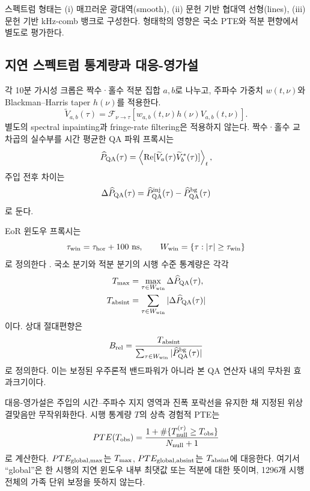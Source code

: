 \documentclass[final,5p,times]{elsarticle}
\newcommand{\NMainRows}{1296}
\begin{document}
스펙트럼 형태는 (i) 매끄러운 광대역(smooth), (ii) 문헌 기반
협대역 선형(lines), (iii) 문헌 기반 kHz-comb 뱅크로 구성한다.
형태학의 영향은 국소 PTE와 적분 편향에서 별도로 평가한다.

\subsection{지연 스펙트럼 통계량과 대응-영가설}
\label{sec:metrics}

각 10분 가시성 크롭은 짝수·홀수 적분 집합 $a,b$로 나누고,
주파수 가중치 $w(t,\nu)$와 Blackman--Harris taper $h(\nu)$를
적용한다.
\begin{equation}
 \widetilde V_{a,b}(\tau)=
 \mathcal F_{\nu\rightarrow\tau}
 \left[w_{a,b}(t,\nu)h(\nu)V_{a,b}(t,\nu)\right].
\end{equation}
별도의 spectral inpainting과 fringe-rate filtering은 적용하지 않는다.
짝수·홀수 교차곱의 실수부를 시간 평균한 QA 파워 프록시는
\begin{equation}
 \widehat P_{\rm QA}(\tau)=
 \left\langle\mathrm{Re}
 [\widetilde V_a(\tau)\widetilde V_b^*(\tau)]\right\rangle_t,
\end{equation}
주입 전후 차이는
\begin{equation}
 \Delta\widehat P_{\rm QA}(\tau)=
 \widehat P_{\rm QA}^{\rm inj}(\tau)-\widehat P_{\rm QA}^{\rm bg}(\tau)
\end{equation}
로 둔다.

EoR 윈도우 프록시는
\begin{equation}
 \tau_{\rm win}=\tau_{\rm hor}+100~{\rm ns},\qquad
 W_{\rm win}=\{\tau:|\tau|\ge\tau_{\rm win}\}
\end{equation}
로 정의한다
\citep{parsons2012delay,pober2013,liu2014wedge}. 국소 분기와 적분
분기의 시행 수준 통계량은 각각
\begin{align}
 T_{\rm max}&=\max_{\tau\in W_{\rm win}}
              \Delta\widehat P_{\rm QA}(\tau),\\
 T_{\rm absint}&=\sum_{\tau\in W_{\rm win}}
              |\Delta\widehat P_{\rm QA}(\tau)|
\end{align}
이다. 상대 절대편향은
\begin{equation}
 B_{\rm rel}=\frac{T_{\rm absint}}
 {\sum_{\tau\in W_{\rm win}}|\widehat P_{\rm QA}^{\rm bg}(\tau)|}
\end{equation}
로 정의한다. 이는 보정된 우주론적 밴드파워가 아니라 본 QA 연산자
내의 무차원 효과크기이다.

대응-영가설은 주입의 시간--주파수 지지 영역과 진폭 포락선을
유지한 채 지정된 위상 결맞음만 무작위화한다. 시행 통계량 $T$의
상측 경험적 PTE는
\begin{equation}
 PTE(T_{\rm obs})=
 \frac{1+\#\{T_{\rm null}^{(r)}\ge T_{\rm obs}\}}{N_{\rm null}+1}
\end{equation}
로 계산한다. $PTE_{\rm global,max}$는 $T_{\rm max}$,
$PTE_{\rm global,absint}$는 $T_{\rm absint}$에 대응한다. 여기서
``global''은 한 시행의 지연 윈도우 내부 최댓값 또는 적분에 대한
뜻이며, \NMainRows{}개 시행 전체의 가족 단위 보정을 뜻하지 않는다.
\end{document}

